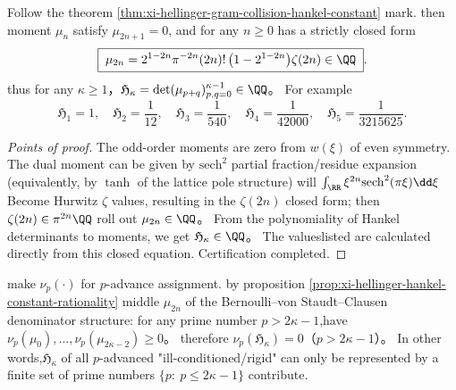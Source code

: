 \begin{proposition}\label{prop:xi-hellinger-hankel-constant-rationality}
Follow the theorem \ref{thm:xi-hellinger-gram-collision-hankel-constant} mark.
then moment \(\mu_n\) satisfy \(\mu_{2n+1}=0\), and for any \(n\ge 0\) has a strictly closed form
\[
\boxed{\;
\mu_{2n}
=2^{1-2n}\pi^{-2n}(2n)!\,\bigl(1-2^{1-2n}\bigr)\zeta(2n)\in\QQ\; }.
\]
thus for any \(\kappa\ge 1\)，\(\mathfrak H_\kappa=\det(\mu_{p+q})_{p,q=0}^{\kappa-1}\in\QQ\)。
For example
\[
\boxed{\;
\mathfrak H_1=1,\quad
\mathfrak H_2=\frac{1}{12},\quad
\mathfrak H_3=\frac{1}{540},\quad
\mathfrak H_4=\frac{1}{42000},\quad
\mathfrak H_5=\frac{1}{3215625}.\;}
\]
\end{proposition}
\begin{proof}[Points of proof]
The odd-order moments are zero from \(w(\xi)\) of even symmetry.
The dual moment can be given by \(\mathrm{sech}^2\) partial fraction/residue expansion (equivalently, by \(\tanh\) of the lattice pole structure) will
\(\int_{\RR}\xi^{2n}\mathrm{sech}^{2}(\pi\xi)\dd\xi\)
Become Hurwitz \(\zeta\) values, resulting in the \(\zeta(2n)\) closed form; then
\(\zeta(2n)\in \pi^{2n}\QQ\)
roll out \(\mu_{2n}\in\QQ\)。
From the polynomiality of Hankel determinants to moments, we get \(\mathfrak H_\kappa\in\QQ\)。
The values ​​listed are calculated directly from this closed equation. Certification completed.
\end{proof}

\begin{remark}[Law of Arithmetic Bandwidth:\texorpdfstring{$\mathfrak H_\kappa$}{H_k} of \texorpdfstring{$p$}{p}-Advanced rigidity is only supported in \texorpdfstring{$p\le 2\kappa-1$}{p<=2k-1}]\label{rem:xi-hellinger-hankel-padic-bandwidth}
make \(\nu_p(\cdot)\) for \(p\)-advance assignment.
by proposition \ref{prop:xi-hellinger-hankel-constant-rationality} middle \(\mu_{2n}\) of the Bernoulli--von Staudt--Clausen denominator structure:
for any prime number \(p>2\kappa-1\),have \(\nu_p(\mu_0),\dots,\nu_p(\mu_{2\kappa-2})\ge 0\)。
therefore \(\nu_p(\mathfrak H_\kappa)=0\)（\(p>2\kappa-1\)）。
In other words,\(\mathfrak H_\kappa\) of all \(p\)-advanced "ill-conditioned/rigid" can only be represented by a finite set of prime numbers \(\{p:\ p\le 2\kappa-1\}\) contribute.
\end{remark}

